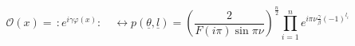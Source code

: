 \begin{equation}
\mathcal{O}(x)=\,:\!e^{i\gamma\varphi(x)}\!:\quad\leftrightarrow
p(\underline{\theta},\underline{l})=\left(  \frac{2}{F(i\pi)\sin\pi\nu
}\right)  ^{\frac{n}{2}}\prod\limits_{i=1}^{n}e^{i\pi\nu\frac{\gamma}{\beta
}(-1)^{l_{i}}} \label{pq}%
\end{equation}

